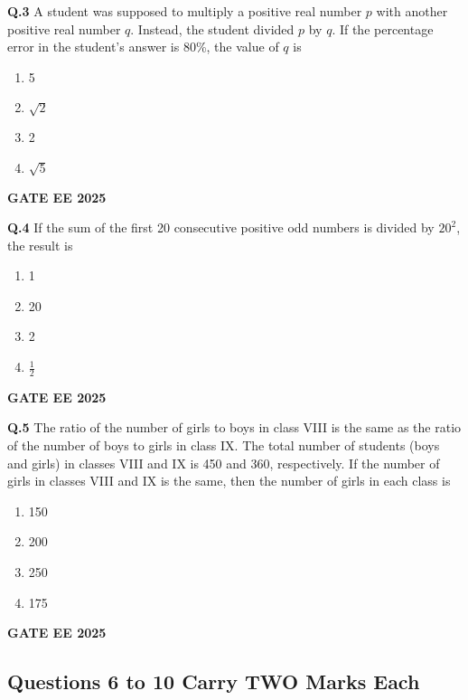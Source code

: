 \documentclass{article}
\begin{document}
\vspace{0.5cm}

\textbf{Q.3} A student was supposed to multiply a positive real number $p$ with another positive real number $q$. Instead, the student divided $p$ by $q$. If the percentage error in the student's answer is 80\%, the value of $q$ is
\begin{enumerate}[label=(\Alph*)]
    \item 5
    \item $\sqrt{2}$
    \item 2
    \item $\sqrt{5}$
\end{enumerate}
\textbf{GATE EE 2025}

\vspace{0.5cm}

\textbf{Q.4} If the sum of the first 20 consecutive positive odd numbers is divided by $20^2$, the result is
\begin{enumerate}[label=(\Alph*)]
    \item 1
    \item 20
    \item 2
    \item $\frac{1}{2}$
\end{enumerate}
\textbf{GATE EE 2025}

\vspace{0.5cm}

\textbf{Q.5} The ratio of the number of girls to boys in class VIII is the same as the ratio of the number of boys to girls in class IX. The total number of students (boys and girls) in classes VIII and IX is 450 and 360, respectively. If the number of girls in classes VIII and IX is the same, then the number of girls in each class is
\begin{enumerate}[label=(\Alph*)]
    \item 150
    \item 200
    \item 250
    \item 175
\end{enumerate}
\textbf{GATE EE 2025}

\vspace{0.5cm}

\subsection*{Questions 6 to 10 Carry TWO Marks Each}
\end{document}
